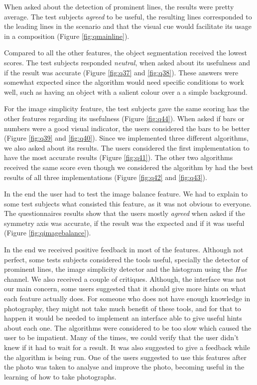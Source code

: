When asked about the detection of prominent lines, the results were pretty average. The test subjects \emph{agreed} to be useful, the resulting lines corresponded to the leading lines in the scenario and that the visual cue would facilitate its usage in a composition (Figure \ref{fig:qmainline}).

Compared to all the other features, the object segmentation received the lowest scores. The test subjects responded \emph{neutral}, when asked about its usefulness and if the result was accurate (Figure \ref{fig:q37} and \ref{fig:q38}). These answers were somewhat expected since the algorithm would need specific conditions to work well, such as having an object with a salient colour over a a simple background.

For the image simplicity feature, the test subjects gave the same scoring has the other features regarding its usefulness (Figure \ref{fig:q44}). When asked if bars or numbers were a good visual indicator, the users considered the bars to be better (Figure \ref{fig:q39} and \ref{fig:q40}). Since we implemented three different algorithms, we also asked about its results. The users considered the first implementation \cite{luo2008photo} to have the most accurate results (Figure \ref{fig:q41}). The other two algorithms \cite{kaoautomatic,ke2006design} received the same score even though we considered the algorithm by \citeauthor{ke2006design} \cite{ke2006design} had the best results of all three implementations (Figure \ref{fig:q42} and \ref{fig:q43}).

In the end the user had to test the image balance feature. We had to explain to some test subjects what consisted this feature, as it was not obvious to everyone. The questionnaires results show that the users mostly \emph{agreed} when asked if the symmetry axis was accurate, if the result was the expected and if it was useful (Figure \ref{fig:qimagebalance}).

In the end we received positive feedback in most of the features. Although not perfect, some tests subjects considered the tools useful, specially the detector of prominent lines, the image simplicity detector and the histogram using the \emph{Hue} channel.
We also received a couple of critiques. Although, the interface was not our main concern, some users suggested that it should give more hints on what each feature actually does. For someone who does not have enough knowledge in photography, they might not take much benefit of these tools, and for that to happen it would be needed to implement an interface able to give useful hints about each one. The algorithms were considered to be too slow which caused the user to be impatient. Many of the times, we could verify that the user didn't knew if it had to wait for a result. It was also suggested to give a feedback while the algorithm is being run.
One of the users suggested to use this features after the photo was taken to analyse and improve the photo, becoming useful in the learning of how to take photographs.